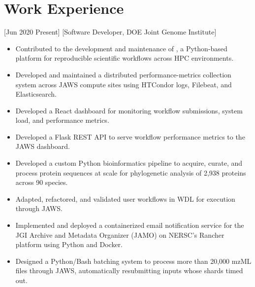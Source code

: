 \documentclass[11pt]{article}
\begin{document}
\makecvtitle

\section{Work Experience}

[Jun 2020 \textendash{} Present]
  [Software Developer, DOE Joint Genome Institute]
\begin{itemize}
  \item Contributed to the development and maintenance of , a Python-based platform for reproducible scientific workflows across HPC environments.
  \item Developed and maintained a distributed performance-metrics collection system across JAWS compute sites using HTCondor logs, Filebeat, and Elasticsearch.
  \item Developed a React dashboard for monitoring workflow submissions, system load, and performance metrics.
  \item Developed a Flask REST API to serve workflow performance metrics to the JAWS dashboard.
  \item Developed a custom Python bioinformatics pipeline to acquire, curate, and process protein sequences at scale for phylogenetic analysis of 2,938 proteins across 90 species.
  \item Adapted, refactored, and validated user workflows in WDL for execution through JAWS.
  \item Implemented and deployed a containerized email notification service for the JGI Archive and Metadata Organizer (JAMO) on NERSC's Rancher platform using Python and Docker.
  \item Designed a Python/Bash batching system to process more than 20,000 mzML files through JAWS, automatically resubmitting inputs whose shards timed out.
\end{itemize}
\end{document}
